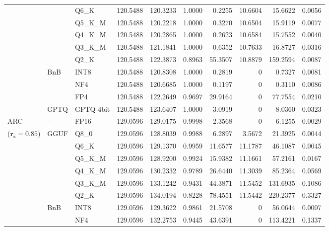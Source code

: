 \begin{longtable}{ll l rrrrrrr}
 &  & Q6\_K & 120.5488 & 120.3233 & 1.0000 & 0.2255 & 10.6604 & 15.6622 & 0.0056 \\
 &  & Q5\_K\_M & 120.5488 & 120.2218 & 1.0000 & 0.3270 & 10.6504 & 15.9119 & 0.0077 \\
 &  & Q4\_K\_M & 120.5488 & 120.2865 & 1.0000 & 0.2623 & 10.6584 & 15.7552 & 0.0040 \\
 &  & Q3\_K\_M & 120.5488 & 121.1841 & 1.0000 & 0.6352 & 10.7633 & 16.8727 & 0.0316 \\
 &  & Q2\_K & 120.5488 & 122.3873 & \cellcolor{red!18} 0.8963 & \cellcolor{red!18} 55.3507 & 10.8879 & \cellcolor{red!18} 159.2594 & \cellcolor{red!18} 0.0087 \\
 & BnB & INT8 & 120.5488 & 120.8308 & 1.0000 & 0.2819 & \cellcolor{cyan!12} $0$ & 0.7327 & 0.0081 \\
 &  & NF4 & 120.5488 & 120.6685 & 1.0000 & 0.1197 & \cellcolor{cyan!12} $0$ & 0.3110 & 0.0086 \\
 &  & FP4 & 120.5488 & 122.2649 & 0.9697 & 29.9164 & \cellcolor{cyan!12} $0$ & 77.7554 & 0.0210 \\
 & GPTQ & GPTQ-4bit & 120.5488 & 123.6407 & 1.0000 & 3.0919 & \cellcolor{cyan!12} $0$ & 8.0360 & 0.0323 \\
\midrule
ARC & -- & FP16 & 129.0596 & 129.0175 & 0.9998 & 2.3568 & \cellcolor{cyan!12} $0$ & 6.1255 & 0.0029 \\
{\small ($\mathbf{r_s{=}0.85}$)} & GGUF & Q8\_0 & 129.0596 & 128.8039 & 0.9988 & 6.2897 & 3.5672 & 21.3925 & 0.0044 \\
 &  & Q6\_K & 129.0596 & 129.1370 & 0.9959 & 11.6577 & 11.1787 & 46.1087 & 0.0045 \\
 &  & Q5\_K\_M & 129.0596 & 128.9200 & 0.9924 & 15.9382 & 11.1661 & 57.2161 & 0.0167 \\
 &  & Q4\_K\_M & 129.0596 & 130.2332 & 0.9789 & 26.6440 & 11.3039 & 85.2364 & 0.0569 \\
 &  & Q3\_K\_M & 129.0596 & 133.1242 & \cellcolor{red!18} 0.9431 & \cellcolor{red!18} 44.3871 & 11.5452 & \cellcolor{red!18} 131.6935 & \cellcolor{red!18} 0.1086 \\
 &  & Q2\_K & 129.0596 & 134.0194 & \cellcolor{red!18} 0.8228 & \cellcolor{red!18} 78.4551 & 11.5442 & \cellcolor{red!18} 220.2377 & \cellcolor{red!18} 0.3327 \\
 & BnB & INT8 & 129.0596 & 129.3622 & 0.9861 & 21.5708 & \cellcolor{cyan!12} $0$ & 56.0644 & 0.0007 \\
 &  & NF4 & 129.0596 & 132.2753 & \cellcolor{red!18} 0.9445 & \cellcolor{red!18} 43.6391 & \cellcolor{cyan!12} $0$ & \cellcolor{red!18} 113.4221 & \cellcolor{red!18} 0.1337 \\

\end{longtable}
